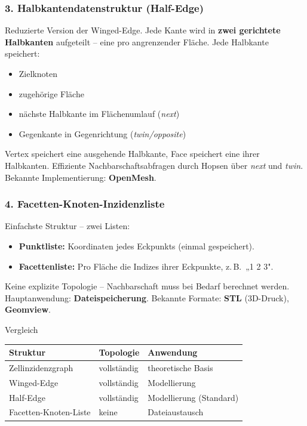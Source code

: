 \documentclass[12pt, a4paper]{article}
\begin{document}
\subsubsection*{3. Halbkantendatenstruktur (Half-Edge)}

Reduzierte Version der Winged-Edge. Jede Kante wird in \textbf{zwei gerichtete Halbkanten} aufgeteilt -- eine pro angrenzender Fläche. Jede Halbkante speichert:
\begin{itemize}
  \item Zielknoten
  \item zugehörige Fläche
  \item nächste Halbkante im Flächenumlauf (\textit{next})
  \item Gegenkante in Gegenrichtung (\textit{twin/opposite})
\end{itemize}
Vertex speichert eine ausgehende Halbkante, Face speichert eine ihrer Halbkanten. Effiziente Nachbarschaftsabfragen durch Hopsen über \textit{next} und \textit{twin}. Bekannte Implementierung: \textbf{OpenMesh}.

\subsubsection*{4. Facetten-Knoten-Inzidenzliste}

Einfachste Struktur -- zwei Listen:
\begin{itemize}
  \item \textbf{Punktliste:} Koordinaten jedes Eckpunkts (einmal gespeichert).
  \item \textbf{Facettenliste:} Pro Fläche die Indizes ihrer Eckpunkte, z.\,B.\ „1 2 3".
\end{itemize}
Keine explizite Topologie -- Nachbarschaft muss bei Bedarf berechnet werden. Hauptanwendung: \textbf{Dateispeicherung}. Bekannte Formate: \textbf{STL} (3D-Druck), \textbf{Geomview}.

\begin{notebox}{Vergleich}
\begin{tabular}{lll}
  \textbf{Struktur} & \textbf{Topologie} & \textbf{Anwendung} \\
  \hline
  Zellinzidenzgraph & vollständig & theoretische Basis \\
  Winged-Edge & vollständig & Modellierung \\
  Half-Edge & vollständig & Modellierung (Standard) \\
  Facetten-Knoten-Liste & keine & Dateiaustausch \\
\end{tabular}
\end{notebox}
\end{document}
